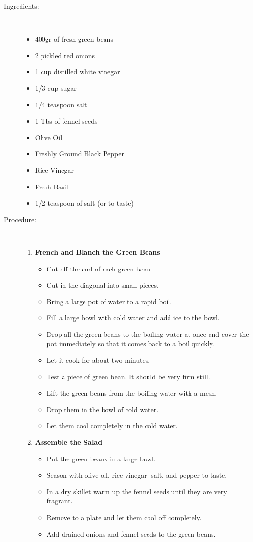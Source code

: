 \documentclass[11pt,letterpaper]{article}
\begin{document}


\begin{description}

\item[Ingredients:]\ \\
	\begin{itemize}
	\item 400gr of fresh green beans
	\item 2 \href{PickledRedOnions.html}{pickled red onions}
	\item 1 cup distilled white vinegar
	\item 1/3 cup sugar
	\item 1/4 teaspoon salt
	\item 1 Tbs of fennel seeds
	\item Olive Oil
	\item Freshly Ground Black Pepper
	\item Rice Vinegar
	\item Fresh Basil
	\item 1/2 teaspoon of salt (or to taste)
	\end{itemize}

\item[Procedure:]\ \\
	\begin{enumerate}
	\item {\bf French and Blanch the Green Beans}
	\begin{itemize}
	\item Cut off the end of each green bean.
	\item Cut in the diagonal into small pieces.
	\item Bring a large pot of water to a rapid boil.
	\item Fill a large bowl with cold water and add ice to the bowl.
	\item Drop all the green beans to the boiling water at once and cover the pot immediately so that it comes back to a boil quickly.
	\item Let it cook for about two minutes.
	\item Test a piece of green bean. It should be very firm still.
	\item Lift the green beans from the boiling water with a mesh.
	\item Drop them in the bowl of cold water.
	\item Let them cool completely in the cold water.
	\end{itemize}
	\item {\bf Assemble the Salad}
	\begin{itemize}
	\item Put the green beans in a large bowl.
	\item Season with olive oil, rice vinegar, salt, and pepper to taste.
	\item In a dry skillet warm up the fennel seeds until they are very fragrant.
	\item Remove to a plate and let them cool off completely.
	\item Add drained onions and fennel seeds to the green beans.
	\end{itemize}
	\end{enumerate}
\end{description}
\end{document}
